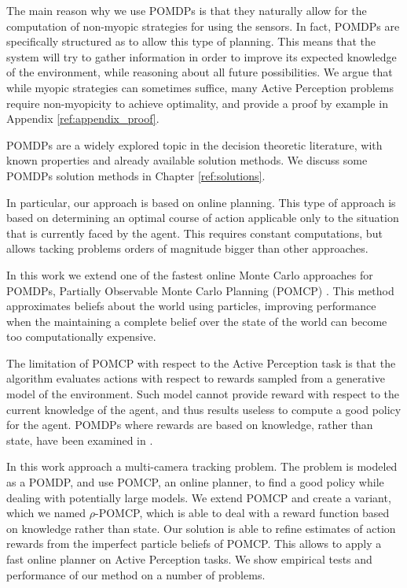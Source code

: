 The main reason why we use POMDPs is that they naturally allow for the computation of non-myopic
strategies for using the sensors. In fact, POMDPs are specifically structured as to allow this type
of planning. This means that the system will try to gather information in order to improve its
expected knowledge of the environment, while reasoning about all future possibilities. We argue that
while myopic strategies can sometimes suffice, many Active Perception problems require non-myopicity
to achieve optimality, and provide a proof by example in Appendix \ref{ref:appendix_proof}.

%

POMDPs are a widely explored topic in the decision theoretic literature, with known properties and
already available solution methods. We discuss some POMDPs solution methods in Chapter
\ref{ref:solutions}.

In particular, our approach is based on online planning. This type of approach is based on
determining an optimal course of action applicable only to the situation that is currently faced by
the agent. This requires constant computations, but allows tacking problems orders of magnitude
bigger than other approaches.

In this work we extend one of the fastest online Monte Carlo approaches for POMDPs, Partially
Observable Monte Carlo Planning (POMCP) \cite{cit:pomcp}. This method approximates beliefs about the
world using particles, improving performance when the maintaining a complete belief over the state
of the world can become too computationally expensive.

The limitation of POMCP with respect to the Active Perception task is that the algorithm evaluates
actions with respect to rewards sampled from a generative model of the environment. Such model
cannot provide reward with respect to the current knowledge of the agent, and thus results useless
to compute a good policy for the agent. POMDPs where rewards are based on knowledge, rather than
state, have been examined in \cite{cit:rpomdp}.

In this work approach a multi-camera tracking problem. The problem is modeled as a POMDP, and use
POMCP, an online planner, to find a good policy while dealing with potentially large models. We
extend POMCP and create a variant, which we named $\rho$-POMCP, which is able to deal with a reward
function based on knowledge rather than state. Our solution is able to refine estimates of action
rewards from the imperfect particle beliefs of POMCP. This allows to apply a fast online planner on
Active Perception tasks. We show empirical tests and performance of our method on a number of
problems.
